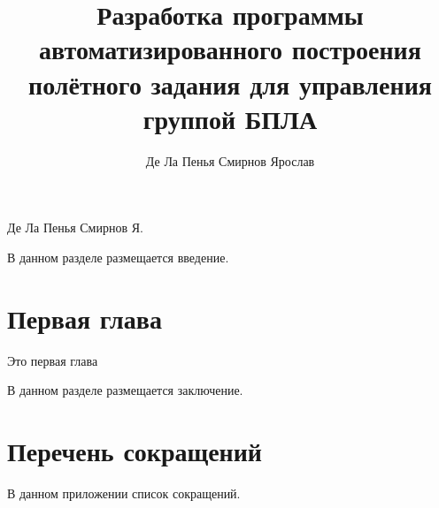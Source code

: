 \documentclass{itmo-student-thesis}
\begin{document}
\title{Разработка программы автоматизированного построения полётного задания для
управления группой БПЛА}
\author{Де Ла Пенья Смирнов Ярослав}{Де Ла Пенья Смирнов Я.}




\tableofcontents

\startprefacepage

В данном разделе размещается введение.

\chapter{Первая глава}

Это первая глава

\startconclusionpage

В данном разделе размещается заключение.

\printmainbibliography

\appendix

\chapter{Перечень сокращений}\label{sec:app:1}

В данном приложении список сокращений.
\end{document}
